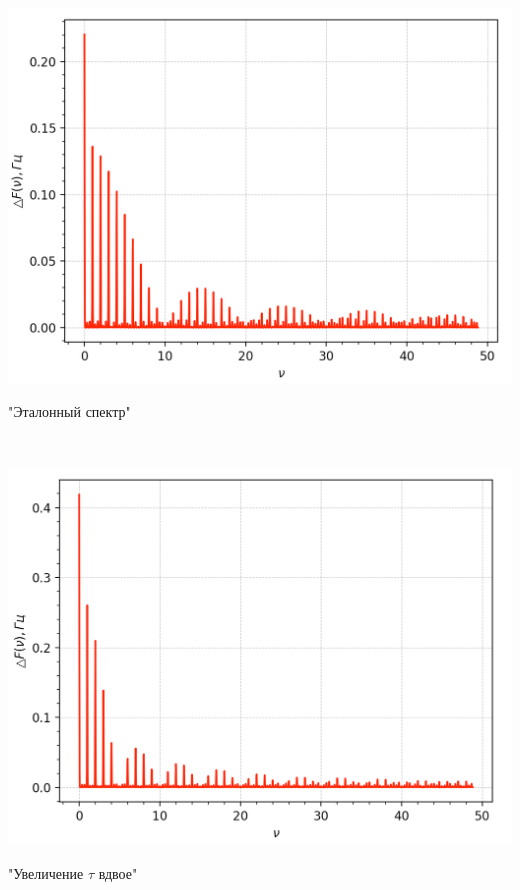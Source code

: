 \begin{minipage}{0.44\textwidth}
\includegraphics[width=\linewidth]{1.png}\\
\begin{center}
"Эталонный спектр"
\end{center}
\end{minipage}
\begin{minipage}{0.1\textwidth}
\ \ \ \ \ \ \Rightarrow
\end{minipage}
\begin{minipage}{0.44\textwidth}
\includegraphics[width=\linewidth]{2.png}\\
\begin{center}
"Увеличение $\tau$ вдвое"
\end{center}
\end{minipage}

